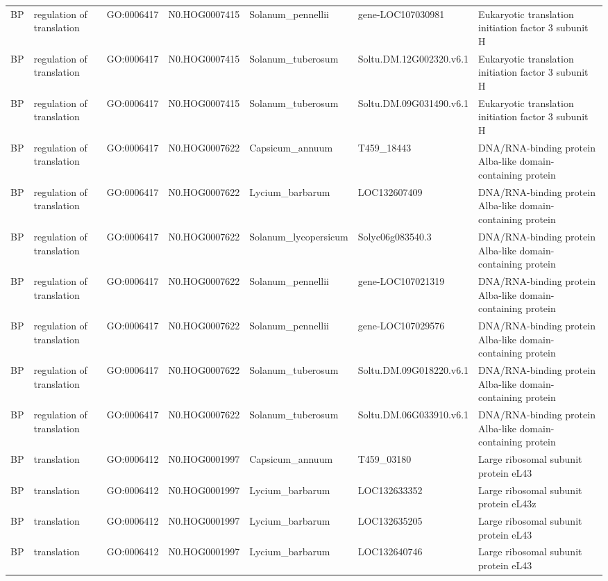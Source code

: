 \begin{table}
\begin{tabular}[t]{lllllll}
BP & regulation of translation & GO:0006417 & N0.HOG0007415 & Solanum\_pennellii & gene-LOC107030981 & Eukaryotic translation initiation factor 3 subunit H\\
BP & regulation of translation & GO:0006417 & N0.HOG0007415 & Solanum\_tuberosum & Soltu.DM.12G002320.v6.1 & Eukaryotic translation initiation factor 3 subunit H\\
BP & regulation of translation & GO:0006417 & N0.HOG0007415 & Solanum\_tuberosum & Soltu.DM.09G031490.v6.1 & Eukaryotic translation initiation factor 3 subunit H\\
BP & regulation of translation & GO:0006417 & N0.HOG0007622 & Capsicum\_annuum & T459\_18443 & DNA/RNA-binding protein Alba-like domain-containing protein\\
BP & regulation of translation & GO:0006417 & N0.HOG0007622 & Lycium\_barbarum & LOC132607409 & DNA/RNA-binding protein Alba-like domain-containing protein\\
BP & regulation of translation & GO:0006417 & N0.HOG0007622 & Solanum\_lycopersicum & Solyc06g083540.3 & DNA/RNA-binding protein Alba-like domain-containing protein\\
BP & regulation of translation & GO:0006417 & N0.HOG0007622 & Solanum\_pennellii & gene-LOC107021319 & DNA/RNA-binding protein Alba-like domain-containing protein\\
BP & regulation of translation & GO:0006417 & N0.HOG0007622 & Solanum\_pennellii & gene-LOC107029576 & DNA/RNA-binding protein Alba-like domain-containing protein\\
BP & regulation of translation & GO:0006417 & N0.HOG0007622 & Solanum\_tuberosum & Soltu.DM.09G018220.v6.1 & DNA/RNA-binding protein Alba-like domain-containing protein\\
BP & regulation of translation & GO:0006417 & N0.HOG0007622 & Solanum\_tuberosum & Soltu.DM.06G033910.v6.1 & DNA/RNA-binding protein Alba-like domain-containing protein\\
BP & translation & GO:0006412 & N0.HOG0001997 & Capsicum\_annuum & T459\_03180 & Large ribosomal subunit protein eL43\\
BP & translation & GO:0006412 & N0.HOG0001997 & Lycium\_barbarum & LOC132633352 & Large ribosomal subunit protein eL43z\\
BP & translation & GO:0006412 & N0.HOG0001997 & Lycium\_barbarum & LOC132635205 & Large ribosomal subunit protein eL43\\
BP & translation & GO:0006412 & N0.HOG0001997 & Lycium\_barbarum & LOC132640746 & Large ribosomal subunit protein eL43\\

\end{tabular}
\end{table}
